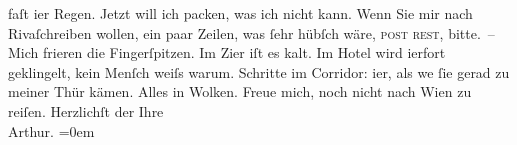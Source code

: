 \begin{ledgroupsized}[t]{13cm}
                    faſt i{\geminationm}er Regen. {\pb}Jetzt
                    will ich packen, was ich nicht kann.\pend
           \pstart
           Wenn Sie mir nach Rivaſchreiben wollen, ein paar Zeilen, was ſehr
                    hübſch wäre, \textsc{post rest}, bitte. –\pend
           \pstart
           Mich frieren die Fingerſpitzen. Im Zi{\geminationm}er iſt es
                    kalt. Im Hotel wird i{\geminationm}erfort geklingelt, kein
                    Menſch weiſs warum. Schritte im Corridor: i{\geminationm}er, als
                        we{\geminationn}{ }ſie gerad zu meiner Thür kämen. Alles in
                    Wolken. {\pb}Freue mich, noch nicht nach Wien zu reiſen.\pend
           \pstart
           Herzlichſt der Ihre{\\[\baselineskip]}\spacefill\mbox{Arthur.}\pend
           \leftskip=0em{}\endnumbering{}\end{ledgroupsized}  \newcommand{\dateiname}{L00122}\newcommand{\titel}{Arthur Schnitzler an Hugo von Hofmannsthal, 11. 9. 1892}\newcommand{\editorInnen}{Martin Anton Müller und Gerd-Hermann Susen}
      